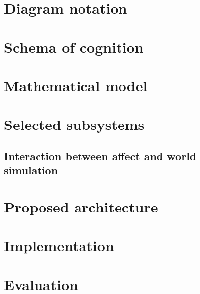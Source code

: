\documentclass[bibliography=totoc ]{scrartcl}
\begin{document}


\section{Diagram notation}



\section{Schema of cognition}\label{sec:schemaOfCognition}



\section{Mathematical model}\label{sec:mathematicalModel}



\section{Selected subsystems}\label{sec:selectedSubsystems}



\subsection{Interaction between affect and world simulation}



\section{Proposed architecture}\label{sec:proposedArchitecture}

\section{Implementation}\label{sec:implementation}



\section{Evaluation}


\endgroup

\pagebreak

\nocite{*}



\end{document}
